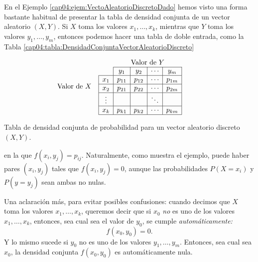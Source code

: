 En el Ejemplo \ref{cap04:ejem:VectoAleatorioDiscretoDado} hemos visto una forma bastante habitual de presentar la tabla de densidad conjunta de un vector aleatorio $(X,Y)$. Si $X$ toma los valores $x_1,\ldots,x_k$, mientras que $Y$ toma los valores $y_1,\ldots,y_m$, entonces podemos hacer una tabla de doble entrada, como la Tabla \ref{cap04:tabla:DensidadConjuntaVectorAleatorioDiscreto}
\begin{table}[h!]
\[
\hspace{-1cm}\mbox{Valor de $X$}\quad\begin{array}{|c|c|c|c|c|}
\multicolumn{1}{c}{} &\multicolumn{4}{c}{\mbox{Valor de $Y$}}{}\\
\cline{2-5}
\multicolumn{1}{c|}{} &y_1    & y_2   & \cdots    & y_m\\
    \hline
x_1 &p_{11} & p_{12}& \cdots    & p_{1m}\\
    \hline
x_2 &p_{21} & p_{22}& \cdots    & p_{2m}\\
\hline
\vdots&     &       & \ddots    &       \\
    \hline
x_k &p_{k1} & p_{k2}& \cdots    & p_{km}\\
    \hline
\end{array}
\]
\caption{Tabla de densidad conjunta de probabilidad para un vector aleatorio discreto $(X,Y)$.}
\label{cap04:tabla:DensidadConjuntaVectorAleatorioDiscreto}
\end{table}
en la que $f(x_i,y_j)=p_{ij}$. Naturalmente, como muestra el ejemplo, puede haber pares $(x_i,y_j)$ tales que $f(x_i,y_j)=0$, aunque las probabilidades $P(X=x_i)$ y $P(y=y_j)$ sean ambas no nulas.

Una aclaración más, para evitar posibles confusiones: cuando decimos que $X$ toma los valores $x_1,\ldots,x_k$, queremos decir que si $x_0$ {\em no} es uno de los valores $x_1,\ldots,x_k$, entonces, sea cual sea el valor de $y_0$, se cumple {\em automáticamente:}
\[
f(x_0,y_0)=0.
\]
Y lo mismo sucede si $y_0$ no es uno de los valores $y_1,\ldots,y_m$. Entonces, sea cual sea $x_0$, la densidad conjunta $f(x_0,y_0)$ es automáticamente nula.

